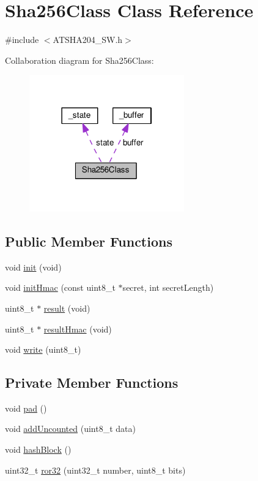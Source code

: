 \hypertarget{classSha256Class}{}\section{Sha256\+Class Class Reference}
\label{classSha256Class}


{\ttfamily \#include $<$A\+T\+S\+H\+A204\+\_\+\+S\+W.\+h$>$}



Collaboration diagram for Sha256\+Class\+:
\nopagebreak
\begin{figure}[H]
\begin{center}
\leavevmode
\includegraphics[width=190pt]{classSha256Class__coll__graph}
\end{center}
\end{figure}
\subsection*{Public Member Functions}
\begin{DoxyCompactItemize}
\item 
void \hyperlink{classSha256Class_ac1025d69c51fcd1b882ee41114e58339}{init} (void)
\item 
void \hyperlink{classSha256Class_a7f6acc6b6c922cf168a7bde69408734d}{init\+Hmac} (const uint8\+\_\+t $\ast$secret, int secret\+Length)
\item 
uint8\+\_\+t $\ast$ \hyperlink{classSha256Class_a0ca245a22f8b056a3d1902da3c64b705}{result} (void)
\item 
uint8\+\_\+t $\ast$ \hyperlink{classSha256Class_a7556f29cadf7eaca21a537df41318af3}{result\+Hmac} (void)
\item 
void \hyperlink{classSha256Class_a0f0fc4bd4d8c53d232df0d41d7ea25e0}{write} (uint8\+\_\+t)
\end{DoxyCompactItemize}
\subsection*{Private Member Functions}
\begin{DoxyCompactItemize}
\item 
void \hyperlink{classSha256Class_a82049dae520ccf0bd8478f2aef639149}{pad} ()
\item 
void \hyperlink{classSha256Class_ab0b46743e3d59b1c68f52ed89dfaff50}{add\+Uncounted} (uint8\+\_\+t data)
\item 
void \hyperlink{classSha256Class_a399d2a23951e2130f54af8ac7712068f}{hash\+Block} ()
\item 
uint32\+\_\+t \hyperlink{classSha256Class_ae275718ce9813bb33b2d8d8fbf018bd6}{ror32} (uint32\+\_\+t number, uint8\+\_\+t bits)
\end{DoxyCompactItemize}
